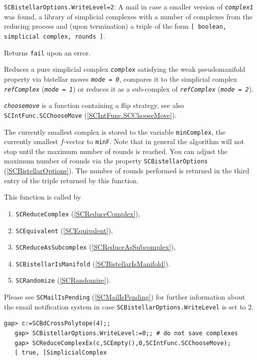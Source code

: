 \documentclass[a4paper,11pt]{report}
\begin{document}
{{{ \texttt{SCBistellarOptions.WriteLevel=2}: A mail in case a smaller version of \mbox{\texttt{\mdseries\slshape complex1}} was found, a library of simplicial complexes with a number of complexes from
the reducing process and (upon termination) a triple of the form \texttt{[ boolean, simplicial complex, rounds ]}.

 Returns \texttt{fail} upon an error.



 Reduces a pure simplicial complex \mbox{\texttt{\mdseries\slshape complex}} satisfying the weak pseudomanifold property via bistellar moves \mbox{\texttt{\mdseries\slshape mode = 0}}, compares it to the simplicial complex \mbox{\texttt{\mdseries\slshape refComplex}} (\mbox{\texttt{\mdseries\slshape mode = 1}}) or reduces it as a sub-complex of \mbox{\texttt{\mdseries\slshape refComplex}} (\mbox{\texttt{\mdseries\slshape mode = 2}}).

 \mbox{\texttt{\mdseries\slshape choosemove}} is a function containing a flip strategy, see also \texttt{SCIntFunc.SCChooseMove} (\ref{SCIntFunc.SCChooseMove}). 

 The currently smallest complex is stored to the variable \texttt{minComplex}, the currently smallest $f$-vector to \texttt{minF}. Note that in general the algorithm will not stop until the maximum number of
rounds is reached. You can adjust the maximum number of rounds via the
property \texttt{SCBistellarOptions} (\ref{SCBistellarOptions}). The number of rounds performed is returned in the third entry of the triple
returned by this function.

 This function is called by 
\begin{enumerate}
\item  \texttt{SCReduceComplex} (\ref{SCReduceComplex}),
\item  \texttt{SCEquivalent} (\ref{SCEquivalent}),
\item  \texttt{SCReduceAsSubcomplex} (\ref{SCReduceAsSubcomplex}),
\item  \texttt{SCBistellarIsManifold} (\ref{SCBistellarIsManifold}).
\item  \texttt{SCRandomize} (\ref{SCRandomize}).
\end{enumerate}
 Please see \texttt{SCMailIsPending} (\ref{SCMailIsPending}) for further information about the email notification system in case \texttt{SCBistellarOptions.WriteLevel} is set to $2$.

 
\begin{Verbatim}[commandchars=!|G,fontsize=\small,frame=single,label=Example]
   gap> c:=SCBdCrossPolytope(4);;
   gap> SCBistellarOptions.WriteLevel:=0;; # do not save complexes                      
   gap> SCReduceComplexEx(c,SCEmpty(),0,SCIntFunc.SCChooseMove);
   [ true, [SimplicialComplex
       

\end{Verbatim}}}}
\end{document}
